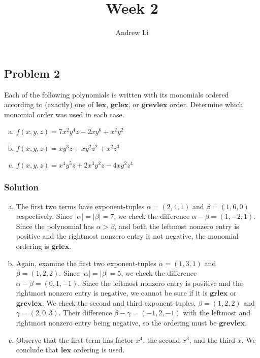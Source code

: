 \documentclass{homework}
\title{Week 2}
\author{Andrew Li}
\newcommand{\lex}{\textbf{lex}}
\newcommand{\grlex}{\textbf{grlex}}
\newcommand{\grevlex}{\textbf{grevlex}}
\begin{document}
    \maketitle
    
    \setcounter{section}{2}
    \setcounter{subsection}{1}
    \subsection{Problem 2}
    
    Each of the following polynomials is written with its monomials ordered according to (exactly) one of $\lex$, $\grlex$, or $\grevlex$ order. Determine which monomial order was used in each case.
    \begin{enumerate}[(a)]
        \item $f(x, y, z) = 7x^2y^4z - 2xy^6 + x^2y^2$
        \item $f(x, y, z) = xy^3z + xy^2z^2 + x^2z^3$
        \item $f(x, y, z) = x^4y^5z + 2x^3y^2z - 4xy^2z^4$
    \end{enumerate}
    
    \subsubsection{Solution}
    
    \begin{enumerate}[(a)]
        \item The first two terms have exponent-tuples $\alpha = (2, 4, 1)$ and $\beta = (1, 6, 0)$ respectively. Since $|\alpha| = |\beta| = 7$, we check the difference $\alpha - \beta = (1, -2, 1)$. Since the polynomial has $\alpha > \beta$, and both the leftmost nonzero entry is positive and the rightmost nonzero entry is not negative, the monomial ordering is $\grlex$.
        \item Again, examine the first two exponent-tuples $\alpha = (1, 3, 1)$ and $\beta = (1, 2, 2)$. Since $|\alpha| = |\beta| = 5$, we check the difference $\alpha - \beta = (0, 1, -1)$. Since the leftmost nonzero entry is positive and the rightmost nonzero entry is negative, we cannot be sure if it is $\grlex$ or $\grevlex$. We check the second and third exponent-tuples, $\beta = (1, 2, 2)$ and $\gamma = (2, 0, 3)$. Their difference $\beta - \gamma = (-1, 2, -1)$ with the leftmost and rightmost nonzero entry being negative, so the ordering must be $\grevlex$.
        \item Observe that the first term has factor $x^4$, the second $x^3$, and the third $x$. We conclude that $\lex$ ordering is used.
    \end{enumerate}
\end{document}
